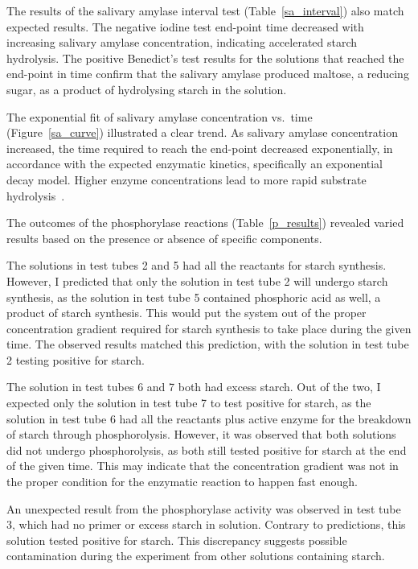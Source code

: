 \documentclass[12pt]{article}
\begin{document}
        The results of the salivary amylase interval test (Table~\ref{sa_interval}) also match expected results. 
        The negative iodine test end-point time decreased with increasing salivary amylase concentration, indicating accelerated starch hydrolysis. 
        The positive Benedict's test results for the solutions that reached the end-point in time confirm that the salivary amylase produced maltose, a reducing sugar, as a product of hydrolysing starch in the solution.
        
        The exponential fit of salivary amylase concentration vs.\ time (Figure~\ref{sa_curve}) illustrated a clear trend. 
        As salivary amylase concentration increased, the time required to reach the end-point decreased exponentially, in accordance with the expected enzymatic kinetics, specifically an exponential decay model. 
        Higher enzyme concentrations lead to more rapid substrate hydrolysis~\parencite{Wang2013}.
        
        The outcomes of the phosphorylase reactions (Table~\ref{p_results}) revealed varied results based on the presence or absence of specific components.
        
        The solutions in test tubes 2 and 5 had all the reactants for starch synthesis. 
        However, I predicted that only the solution in test tube 2 will undergo starch synthesis, as the solution in test tube 5 contained phosphoric acid as well, a product of starch synthesis. 
        This would put the system out of the proper concentration gradient required for starch synthesis to take place during the given time. 
        The observed results matched this prediction, with the solution in test tube 2 testing positive for starch.
        
        The solution in test tubes 6 and 7 both had excess starch. 
        Out of the two, I expected only the solution in test tube 7 to test positive for starch, as the solution in test tube 6 had all the reactants plus active enzyme for the breakdown of starch through phosphorolysis. 
        However, it was observed that both solutions did not undergo phosphorolysis, as both still tested positive for starch at the end of the given time. 
        This may indicate that the concentration gradient was not in the proper condition for the enzymatic reaction to happen fast enough.
        
        An unexpected result from the phosphorylase activity was observed in test tube 3, which had no primer or excess starch in solution. 
        Contrary to predictions, this solution tested positive for starch. 
        This discrepancy suggests possible contamination during the experiment from other solutions containing starch.

    \printbibliography{}
\end{document}
